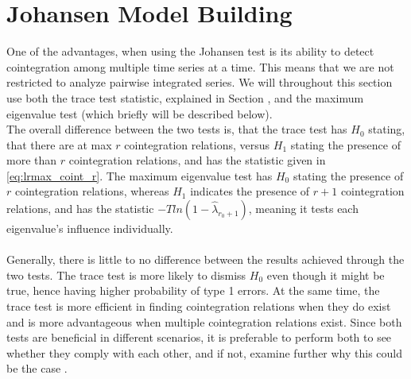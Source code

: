 \section{Johansen Model Building}
One of the advantages, when using the Johansen test is its ability to detect cointegration among multiple time series at a time. This means that we are not restricted to analyze pairwise integrated series. We will throughout this section use both the trace test statistic, explained in Section \cite{Johansen_test}, and the maximum eigenvalue test (which briefly will be described below). \\
The overall difference between the two tests is, that the trace test has $H_0$ stating, that there are at max $r$ cointegration relations, versus $H_1$ stating the presence of more than $r$ cointegration relations, and has the statistic given in \eqref{eq:lrmax_coint_r}. The maximum eigenvalue test has $H_0$ stating the presence of $r$ cointegration relations, whereas $H_1$ indicates the presence of $r+1$ cointegration relations, and has the statistic $-Tln(1-\hat{\lambda}_{r_0+1})$, meaning it tests each eigenvalue's influence individually.\\\\
Generally, there is little to no difference between the results achieved through the two tests. The trace test is more likely to dismiss $H_0$ even though it might be true, hence having higher probability of type 1 errors. At the same time, the trace test is more efficient in finding cointegration relations when they do exist and is more advantageous when multiple cointegration relations exist. Since both tests are beneficial in different scenarios, it is preferable to perform both to see whether they comply with each other, and if not, examine further why this could be the case \citep{johansentestdifferences}.



